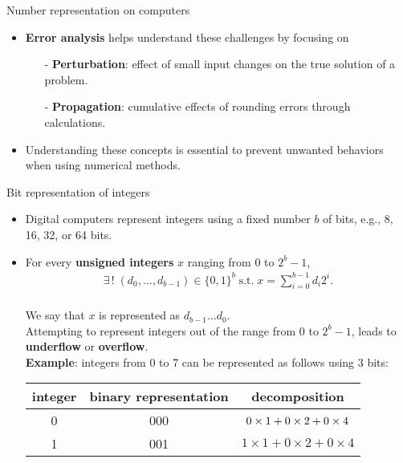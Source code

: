 \documentclass[t,usepdftitle=false]{beamer}
\begin{document}
\begin{frame}{Number representation on computers}
\begin{itemize}
\begin{itemize}
\end{itemize}
\item \textbf{Error analysis} helps understand these challenges by focusing on
\begin{itemize} 
\item[-] \textbf{Perturbation}: effect of small input changes on the true solution of a problem.
\item[-] \textbf{Propagation}: cumulative effects of rounding errors through calculations.
\end{itemize}
\item Understanding these concepts is essential to prevent unwanted behaviors when using numerical methods.
\end{itemize} 
\end{frame}

\begin{frame}{Bit representation of integers} 
\begin{itemize} 
\item Digital computers represent integers using a fixed number $b$ of bits, e.g., 8, 16, 32, or 64 bits.\\
\item For every \textbf{unsigned integers} $x$ ranging from 0 to $2^b-1$,\vspace{-.2cm}
\begin{align*}
\exists\,!\;(d_0,\dots,d_{b-1})\in\{0,1\}^b\;\text{s.t.}\;x=\sum_{i=0}^{b-1}d_i2^i.
\end{align*}
\vspace*{-.55cm}\\
We say that $x$ is represented as $d_{b-1}\dots d_0$.\vspace{.05cm}\\
Attempting to represent integers out of the range from 0 to $2^b-1$, leads to \textbf{underflow} or \textbf{overflow}.\vspace{.05cm}\\
\textbf{Example}: integers from 0 to 7 can be represented as follows using 3 bits:\vspace{.02cm}\\
{\scriptsize
\begin{center}
\begin{tabular}{|c|c|c|}
\hline
integer & binary representation & decomposition\\
\hline
0& 000 & $0\times 1+0\times 2+0\times 4^{{\vphantom{I}}}$\\ 
1& 001 & $1\times 1+0\times 2+0\times 4$\\ 

\end{tabular}
\end{center}}
\end{itemize}
\end{frame}
\end{document}
